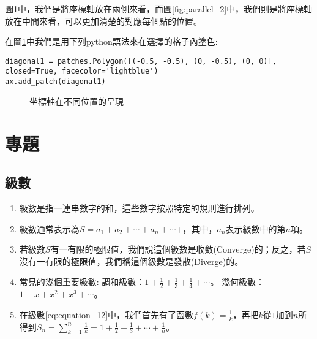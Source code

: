 \documentclass[12pt, a4paper]{article}
\begin{document}
圖\;\ref{fig:parallel2_3}\;\;中，我們是將座標軸放在兩側來看，而圖\;\ref{fig:parallel_2}\;\;中，我們則是將座標軸放在中間來看，可以更加清楚的對應每個點的位置。

在圖\;\ref{fig:parallel2_3}\;中我們是用下列python語法來在選擇的格子內塗色\;:
\begin{lstlisting}
diagonal1 = patches.Polygon([(-0.5, -0.5), (0, -0.5), (0, 0)], closed=True, facecolor='lightblue')
ax.add_patch(diagonal1)
\end{lstlisting}


\begin{figure}[H]
\centering
{}
\caption{坐標軸在不同位置的呈現}
\label{fig:parallel2_3}
\end{figure}

\section{專題}
\subsection{級數}
\begin{enumerate}
\item 級數是指一連串數字的和，這些數字按照特定的規則進行排列。
\item 級數通常表示為\;$S=a_1+a_2+\cdots +a_n+\cdots $+\;，其中，\;$a_n$\;表示級數中的第\;$n$\;項。
\item 若級數\;$S$\;有一有限的極限值，我們說這個級數是收斂(Converge)的；反之，若\;$S$\;沒有一有限的極限值，我們稱這個級數是發散(Diverge)的。
\item 常見的幾個重要級數\;:
\subitem 調和級數\;：\;$1+\frac{1}{2}+\frac{1}{3}+\frac{1}{4}+\cdots$。
\subitem 幾何級數\;：\;$1+x+x^2+x^3+\cdots$。
\item 在級數\;\ref{eq:equation_12}\;中，我們首先有了函數\;$f(k)=\frac{1}{k}$\;，再把\;$k$\;從\;$1$\;加到\;$n$\;所得到\;$S_n=\sum_{k=1}^{n} \frac{1}{k}=1+\frac{1}{2}+\frac{1}{3}+\cdots+\frac{1}{n}$\;。
\end{enumerate}
\end{document}
